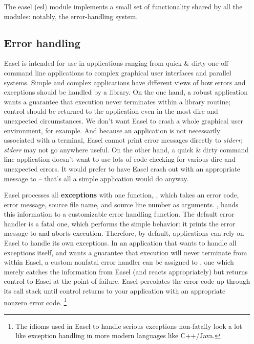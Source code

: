 The easel (esl) module implements a small set of functionality shared
by all the modules: notably, the error-handling system.

\subsection{Error handling}

Easel is intended for use in applications ranging from quick \& dirty
one-off command line applications to complex graphical user interfaces
and parallel systems. Simple and complex applications have different
views of how errors and exceptions should be handled by a library.  On
the one hand, a robust application wants a guarantee that execution
never terminates within a library routine; control should be returned
to the application even in the most dire and unexpected
circumstances. We don't want Easel to crash a whole graphical user
environment, for example. And because an application is not
necessarily associated with a terminal, Easel cannot print error
messages directly to \emph{stderr}; \emph{stderr} may not go anywhere
useful. On the other hand, a quick \& dirty command line application
doesn't want to use lots of code checking for various dire and
unexpected errors. It would prefer to have Easel crash out with an
appropriate message to  -- that's all a simple
application would do anyway.

Easel processes all \textbf{exceptions} with one function,
, which takes an error code, error message,
source file name, and source line number as arguments.
, hands this information to a customizable error
handling function. The default error handler is a fatal one, which
performs the simple behavior: it prints the error message to
 and aborts execution. Therefore, by default,
applications can rely on Easel to handle its own exceptions.  In an
application that wants to handle all exceptions itself, and wants a
guarantee that execution will never terminate from within Easel, a
custom nonfatal error handler can be assigned to ,
one which merely catches the information from Easel (and reacts
appropriately) but returns control to Easel at the point of
failure. Easel percolates the error code up through its call stack
until control returns to your application with an appropriate nonzero
error code. \footnote{The idioms used in Easel to handle serious
exceptions non-fatally look a lot like exception handling in more
modern languages like C++/Java.}

